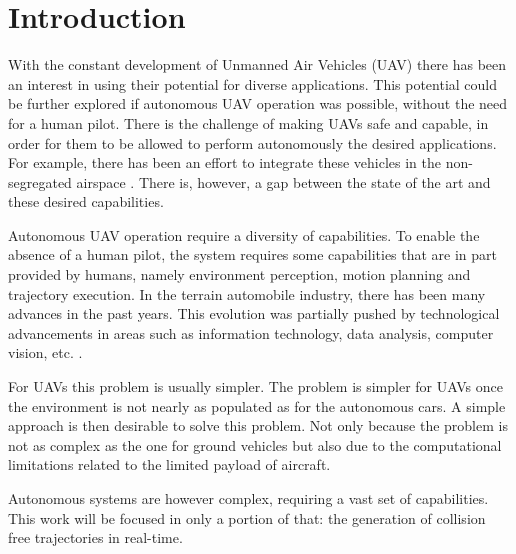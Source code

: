 \section{Introduction}
With the constant development of Unmanned Air Vehicles (UAV) there has been an interest in using their potential for diverse applications. This potential could be further explored if autonomous UAV operation was possible, without the need for a human pilot. There is the challenge of making UAVs safe and capable, in order for them to be allowed to perform autonomously the desired applications. For example, there has been an effort to integrate these vehicles in the non-segregated airspace \cite{ref:history}. There is, however, a gap between the state of the art and these desired capabilities. 
\par
Autonomous UAV operation require a diversity of capabilities. To enable the absence of a human pilot, the system requires some capabilities that are in part provided by humans, namely environment perception, motion planning and trajectory execution. In the terrain automobile industry, there has been many advances in the past years. This evolution was partially pushed by technological advancements in areas such as information technology, data analysis, computer vision, etc.  \cite{ref:autonumousCars}.
\par
For UAVs this problem is usually simpler.  The problem is simpler for UAVs once the environment is not nearly as populated as for the autonomous cars. A simple approach is then desirable to solve this problem. Not only because the problem is not as complex as the one for ground vehicles but also due to the computational limitations related to the limited payload of aircraft. 
\par 
Autonomous systems are however complex, requiring a vast set of capabilities. This work will be focused in only a portion of that: the generation of collision free trajectories in real-time.
